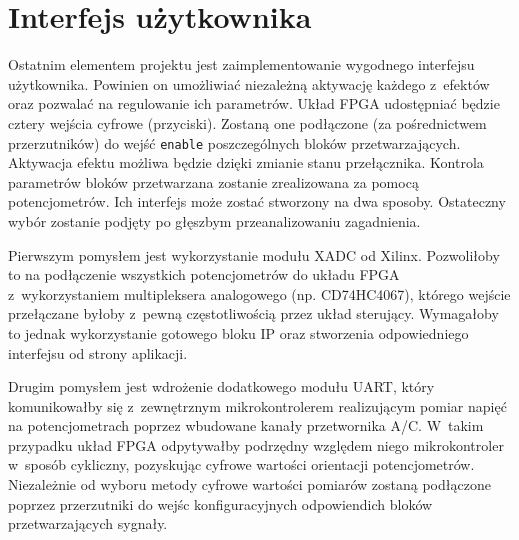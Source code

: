 
\section{Interfejs użytkownika}

Ostatnim elementem projektu jest zaimplementowanie wygodnego interfejsu użytkownika. Powinien on umożliwiać niezależną aktywację każdego z~efektów oraz pozwalać na regulowanie ich parametrów. Układ FPGA udostępniać będzie cztery wejścia cyfrowe (przyciski). Zostaną one podłączone (za pośrednictwem przerzutników) do wejść \verb|enable| poszczególnych bloków przetwarzających. Aktywacja efektu możliwa będzie dzięki zmianie stanu przełącznika. Kontrola parametrów bloków przetwarzana zostanie zrealizowana za pomocą potencjometrów. Ich interfejs może zostać stworzony na dwa sposoby. Ostateczny wybór zostanie podjęty po głęszbym przeanalizowaniu zagadnienia. 

Pierwszym pomysłem jest wykorzystanie modułu XADC od Xilinx. Pozwoliłoby to na podłączenie wszystkich potencjometrów do układu FPGA z~wykorzystaniem multipleksera analogowego (np. CD74HC4067), którego wejście przełączane byłoby z~pewną częstotliwością przez układ sterujący. Wymagałoby to jednak wykorzystanie gotowego bloku IP oraz stworzenia odpowiedniego interfejsu od strony aplikacji.

Drugim pomysłem jest wdrożenie dodatkowego modułu UART, który komunikowałby się z~zewnętrznym mikrokontrolerem realizującym pomiar napięć na potencjometrach poprzez wbudowane kanały przetwornika A/C. W~takim przypadku układ FPGA odpytywałby podrzędny względem niego mikrokontroler w~sposób cykliczny, pozyskując cyfrowe wartości orientacji potencjometrów. Niezależnie od wyboru metody cyfrowe wartości pomiarów zostaną podłączone poprzez przerzutniki do wejśc konfiguracyjnych odpowiendich bloków przetwarzających sygnały.
